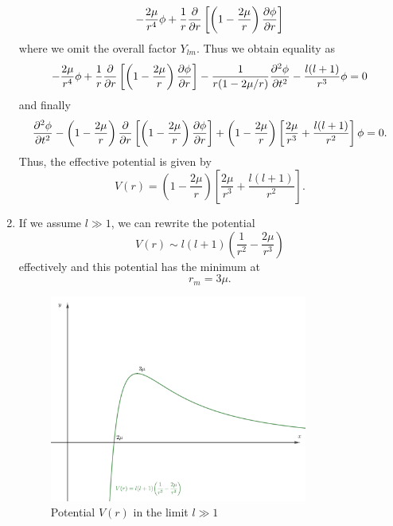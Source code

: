 \documentclass[a4paper,pdftex,10pt]{article}
\begin{document}
\begin{enumerate}
\begin{align}
          -
          \frac{2\mu}{r^4}\phi
          +
          \frac{1}{r}\pdv{}{r}\left[ \left( 1-\frac{2\mu}{r} \right)\pdv{\phi}{r} \right]
        \end{align}
        where we omit the overall factor $Y_{lm}$. Thus we obtain equality as
        \begin{equation}
          -
          \frac{2\mu}{r^4}\phi
          +
          \frac{1}{r}\pdv{}{r}\left[ \left( 1-\frac{2\mu}{r} \right)\pdv{\phi}{r} \right]
          -
          \frac{1}{r(1-2\mu/r)}\pdv[2]{\phi}{t}
          -
          \frac{l(l+1)}{r^3}\phi
          =
          0
        \end{equation}
        and finally
        \begin{equation}
          \pdv[2]{\phi}{t}
          -
          \left( 1-\frac{2\mu}{r} \right)\pdv{}{r}\left[ \left( 1-\frac{2\mu}{r} \right)\pdv{\phi}{r} \right]
          +
          \left( 1-\frac{2\mu}{r} \right)
          \left[ \frac{2\mu}{r^3}+\frac{l(l+1)}{r^2} \right]\phi
          =
          0
          .
        \end{equation}
        Thus, the effective potential is given by
        \begin{equation}
          V(r)
          =
          \left( 1-\frac{2\mu}{r} \right)
          \left[ \frac{2\mu}{r^3}+\frac{l(l+1)}{r^2} \right]
          .
        \end{equation}

  \item
  If we assume $l\gg 1$, we can rewrite the potential
  \begin{equation}
    V(r)
    \sim
    l(l+1)\left( \frac{1}{r^2}-\frac{2\mu}{r^3} \right)
  \end{equation}
  effectively and this potential has the minimum at 
  \begin{equation}
    r_{m}
    =
    3\mu
    .
  \end{equation}

  \begin{figure}[ht]
    \centering
    \includegraphics[width=0.8\textwidth]{potential.PNG}
    \caption{Potential $V(r)$ in the limit $l\gg 1$}
  \end{figure}


\end{enumerate}
\end{document}
